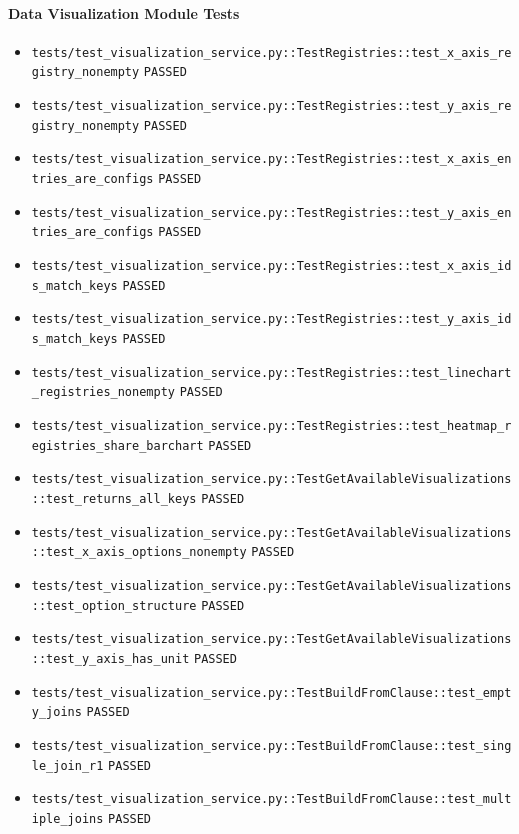 \documentclass[12pt, titlepage]{article}
\begin{document}
\paragraph{Data Visualization Module Tests}
{\small
\begin{itemize}[leftmargin=1.5em, itemsep=0.2em, topsep=0.3em]
  \item \nolinkurl{tests/test_visualization_service.py::TestRegistries::test_x_axis_registry_nonempty} \texttt{PASSED}
  \item \nolinkurl{tests/test_visualization_service.py::TestRegistries::test_y_axis_registry_nonempty} \texttt{PASSED}
  \item \nolinkurl{tests/test_visualization_service.py::TestRegistries::test_x_axis_entries_are_configs} \texttt{PASSED}
  \item \nolinkurl{tests/test_visualization_service.py::TestRegistries::test_y_axis_entries_are_configs} \texttt{PASSED}
  \item \nolinkurl{tests/test_visualization_service.py::TestRegistries::test_x_axis_ids_match_keys} \texttt{PASSED}
  \item \nolinkurl{tests/test_visualization_service.py::TestRegistries::test_y_axis_ids_match_keys} \texttt{PASSED}
  \item \nolinkurl{tests/test_visualization_service.py::TestRegistries::test_linechart_registries_nonempty} \texttt{PASSED}
  \item \nolinkurl{tests/test_visualization_service.py::TestRegistries::test_heatmap_registries_share_barchart} \texttt{PASSED}
  \item \nolinkurl{tests/test_visualization_service.py::TestGetAvailableVisualizations::test_returns_all_keys} \texttt{PASSED}
  \item \nolinkurl{tests/test_visualization_service.py::TestGetAvailableVisualizations::test_x_axis_options_nonempty} \texttt{PASSED}
  \item \nolinkurl{tests/test_visualization_service.py::TestGetAvailableVisualizations::test_option_structure} \texttt{PASSED}
  \item \nolinkurl{tests/test_visualization_service.py::TestGetAvailableVisualizations::test_y_axis_has_unit} \texttt{PASSED}
  \item \nolinkurl{tests/test_visualization_service.py::TestBuildFromClause::test_empty_joins} \texttt{PASSED}
  \item \nolinkurl{tests/test_visualization_service.py::TestBuildFromClause::test_single_join_r1} \texttt{PASSED}
  \item \nolinkurl{tests/test_visualization_service.py::TestBuildFromClause::test_multiple_joins} \texttt{PASSED}

\end{itemize}}
\end{document}
